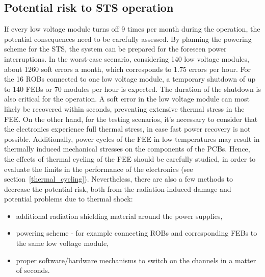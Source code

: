 \subsection{Potential risk to STS operation}
If every low voltage module turns off 9 times per month during the operation, the potential consequences need to be carefully assessed. By planning the powering scheme for the \gls{STS}, the system can be prepared for the foreseen power interruptions. In the worst-case scenario, considering 140 low voltage modules,  about 1260 soft errors a month, which corresponds to 1.75 errors per hour.  For the 16 \glspl{ROB} connected to one low voltage module, a temporary shutdown of up to 140 \glspl{FEB} or 70 modules per hour is expected.  The duration of the shutdown is also critical for the operation. A soft error in the low voltage module can most likely be recovered within seconds, preventing extensive thermal stress in the FEE. On the other hand, for the testing scenarios, it's necessary to consider that the electronics experience full thermal stress, in case fast power recovery is not possible. Additionally, power cycles of the \gls{FEE} in low temperatures may result in thermally induced mechanical stresses on the components of the \glspl{PCB}. Hence, the effects of thermal cycling of the \gls{FEE} should be carefully studied, in order to evaluate the limits in the performance of the electronics  (see section~\ref{thermal_cycling}). Nevertheless, there are also a few methods to decrease the potential risk, both from the radiation-induced damage and potential problems due to thermal shock:
\begin{itemize}
    \item additional radiation shielding material around the power supplies,
    \item powering scheme - for example connecting \glspl{ROB} and corresponding \glspl{FEB} to the same low voltage module,
    \item proper software/hardware mechanisms to switch on the channels in a matter of seconds.
\end{itemize}
\newpage
